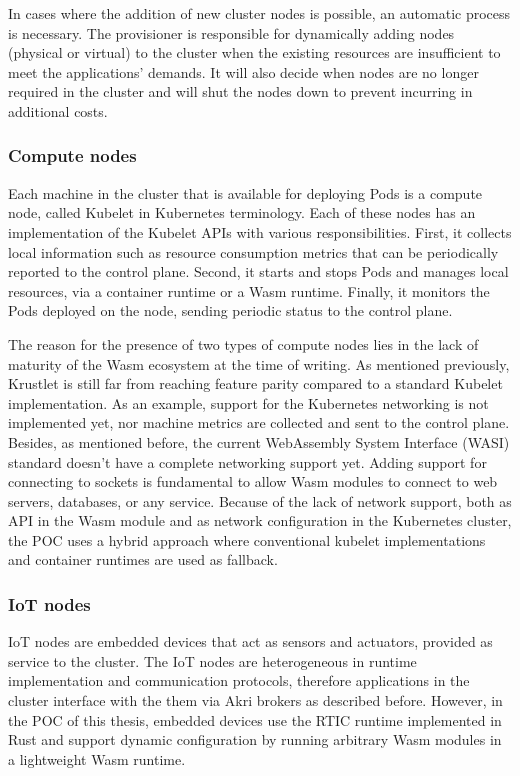 In cases where the addition of new cluster nodes is possible, an automatic process is necessary. The provisioner is responsible for dynamically adding nodes (physical or virtual) to the cluster when the existing resources are insufficient to meet the applications' demands. It will also decide when nodes are no longer required in the cluster and will shut the nodes down to prevent incurring in additional costs.

\subsubsection{Compute nodes}

Each machine in the cluster that is available for deploying Pods is a compute node, called Kubelet in Kubernetes terminology. Each of these nodes has an implementation of the Kubelet APIs with various responsibilities. First, it collects local information such as resource consumption metrics that can be periodically reported to the control plane. Second, it starts and stops Pods and manages local resources, via a container runtime or a Wasm runtime. Finally, it monitors the Pods deployed on the node, sending periodic status to the control plane.

The reason for the presence of two types of compute nodes lies in the lack of maturity of the Wasm ecosystem at the time of writing. As mentioned previously, Krustlet is still far from reaching feature parity compared to a standard Kubelet implementation. As an example, support for the Kubernetes networking is not implemented yet, nor machine metrics are collected and sent to the control plane. Besides, as mentioned before, the current WebAssembly System Interface (WASI) standard doesn't have a complete networking support yet. Adding support for connecting to sockets is fundamental to allow Wasm modules to connect to web servers, databases, or any service. Because of the lack of network support, both as API in the Wasm module and as network configuration in the Kubernetes cluster, the POC uses a hybrid approach where conventional kubelet implementations and container runtimes are used as fallback.

\subsubsection{IoT nodes}

IoT nodes are embedded devices that act as sensors and actuators, provided as service to the cluster. The IoT nodes are heterogeneous in runtime implementation and communication protocols, therefore applications in the cluster interface with the them via Akri brokers as described before. However, in the POC of this thesis, embedded devices use the RTIC runtime implemented in Rust and support dynamic configuration by running arbitrary Wasm modules in a lightweight Wasm runtime.

